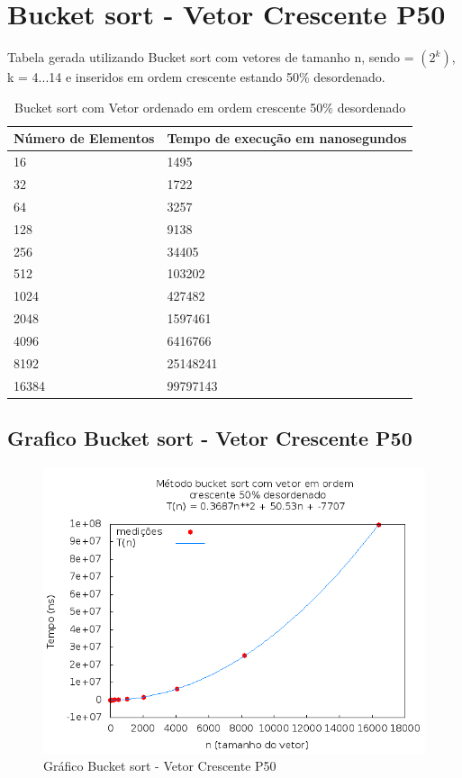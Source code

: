 \documentclass[12pt,a4paper,twoside]{report}
\begin{document}
\section{Bucket sort - Vetor Crescente P50}
Tabela gerada utilizando Bucket sort com vetores de tamanho n, sendo = $(2^k)$, k = 4...14 e inseridos em ordem crescente estando 50\% desordenado.

\begin{table}[H]
\centering
\caption{Bucket sort com Vetor ordenado em ordem crescente 50\% desordenado}
\label{my-label}
\begin{tabular}{|l|l|}
\hline
\multicolumn{1}{|c|}{\textbf{Número de Elementos}} & \multicolumn{1}{c|}{\textbf{Tempo de execução em nanosegundos}} \\ \hline
16 & 1495 \\ \hline
32 & 1722 \\ \hline
64 & 3257 \\ \hline
128 & 9138 \\ \hline
256 & 34405 \\ \hline
512 & 103202 \\ \hline
1024 & 427482 \\ \hline
2048 & 1597461 \\ \hline
4096 & 6416766 \\ \hline
8192 & 25148241 \\ \hline
16384 & 99797143 \\ \hline
\end{tabular}
\end{table}

\subsection{Grafico Bucket sort - Vetor Crescente P50}
\begin{figure}[H]
    \centering
    \includegraphics[width=0.7\linewidth]{graficos/Bucket/vIntCrescenteP50/vIntCrescenteP50.png}
  \caption{Gráfico Bucket sort - Vetor Crescente P50}
\end{figure}
\end{document}
